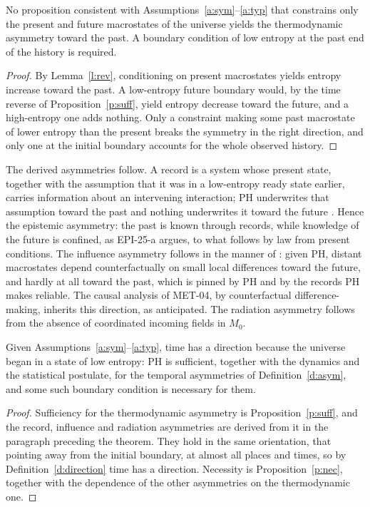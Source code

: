 \documentclass{situationist-preprint}
\begin{document}
\begin{proposition}[Necessity]\label{p:nec}
No proposition consistent with Assumptions~\ref{a:sym}--\ref{a:typ} that constrains only the present and future macrostates of the universe yields the thermodynamic asymmetry toward the past. A boundary condition of low entropy at the past end of the history is required.
\end{proposition}

\begin{proof}
By Lemma~\ref{l:rev}, conditioning on present macrostates yields entropy increase toward the past. A low-entropy future boundary would, by the time reverse of Proposition~\ref{p:suff}, yield entropy decrease toward the future, and a high-entropy one adds nothing. Only a constraint making some past macrostate of lower entropy than the present breaks the symmetry in the right direction, and only one at the initial boundary accounts for the whole observed history.
\end{proof}

The derived asymmetries follow. A record is a system whose present state, together with the assumption that it was in a low-entropy ready state earlier, carries information about an intervening interaction; PH underwrites that assumption toward the past and nothing underwrites it toward the future \citep{Albert2000}. Hence the epistemic asymmetry: the past is known through records, while knowledge of the future is confined, as EPI-25-a argues, to what follows by law from present conditions. The influence asymmetry follows in the manner of \citet{Loewer2007}: given PH, distant macrostates depend counterfactually on small local differences toward the future, and hardly at all toward the past, which is pinned by PH and by the records PH makes reliable. The causal analysis of MET-04, by counterfactual difference-making, inherits this direction, as \citet{Lewis1979} anticipated. The radiation asymmetry follows from the absence of coordinated incoming fields in $M_0$.

\begin{theorem}\label{t:arrow}
Given Assumptions~\ref{a:sym}--\ref{a:typ}, time has a direction because the universe began in a state of low entropy: PH is sufficient, together with the dynamics and the statistical postulate, for the temporal asymmetries of Definition~\ref{d:asym}, and some such boundary condition is necessary for them.
\end{theorem}

\begin{proof}
Sufficiency for the thermodynamic asymmetry is Proposition~\ref{p:suff}, and the record, influence and radiation asymmetries are derived from it in the paragraph preceding the theorem. They hold in the same orientation, that pointing away from the initial boundary, at almost all places and times, so by Definition~\ref{d:direction} time has a direction. Necessity is Proposition~\ref{p:nec}, together with the dependence of the other asymmetries on the thermodynamic one.
\end{proof}
\end{document}
